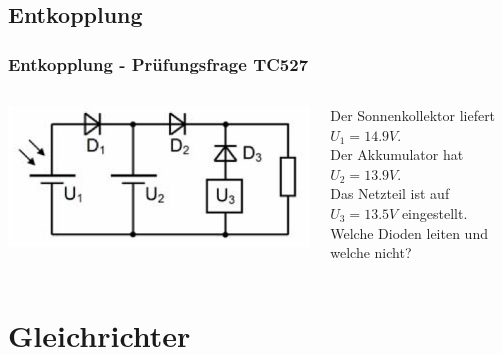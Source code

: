 \subsection*{Entkopplung}
\begin{frame}
  \frametitle{Entkopplung - Prüfungsfrage TC527}
  \begin{columns}[c]
    \begin{center}
      \includegraphics[width=1\textwidth]{a05/TC527.png}\\
      \tiny \hyperlink{refs}{\cite{bna}}
    \end{center}
    Der Sonnenkollektor liefert $U_1 = 14.9V$. \\[0.2em]
    Der Akkumulator hat $U_2 = 13.9V$. \\[0.2em]
    Das Netzteil ist auf $U_3 = 13.5V$ eingestellt. \\[1.2em]
    Welche Dioden leiten und welche nicht?
  \end{columns}
\end{frame}

\section*{Gleichrichter}

